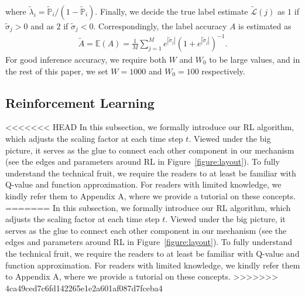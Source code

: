 where $\tilde{\lambda}_i = \tilde{\mathbb{P}}_i/(1-\tilde{\mathbb{P}}_i)$.
Finally, we decide the true label estimate $\tilde{\mathcal{L}}(j)$ as $1$ if $\tilde{\sigma}_j>0$ and as $2$ if $\tilde{\sigma}_j<0$.
Correspondingly, the label accuracy $A$ is estimated as
\begin{equation}
\label{vot}
\begin{split}
\tilde{A}=\mathbb{E}\left(A \right) = \frac{1}{M}{\sum}_{j=1}^{M}e^{|\tilde{\sigma}_j|}\left(1+e^{|\tilde{\sigma}_j|}\right)^{-1}.
\end{split}
\end{equation}
For good inference accuracy, we require both $W$ and $W_0$ to be large values, and in the rest of this paper, we set $W=1000$ and $W_0=100$ respectively.

\subsection{Reinforcement Learning}
<<<<<<< HEAD
In this subsection, we formally introduce our RL algorithm, which adjusts the scaling factor at each time step $t$. Viewed under the big picture, it serves as the glue to connect each other component in our mechanism (see the edges and parameters around RL in Figure~\ref{figure:layout}). To fully understand the technical fruit, we require the readers to at least be familiar with Q-value and function approximation. For readers with limited knowledge, we kindly refer them to Appendix A, where we provide a tutorial on these concepts.
=======
In this subsection, we formally introduce our RL algorithm, which adjusts the scaling factor at each time step $t$. Viewed under the big picture, it serves as the glue to connect each other component in our mechanism (see the edges and parameters around RL in Figure~\ref{figure:layout}). To fully understand the technical fruit, we require the readers to at least be familiar with Q-value and function approximation. For readers with limited knowledge, we kindly refer them to Appendix A, where we provide a tutorial on these concepts. %
>>>>>>> 4ca49ced7c6fd142265e1e2a601af087d7fceba4

